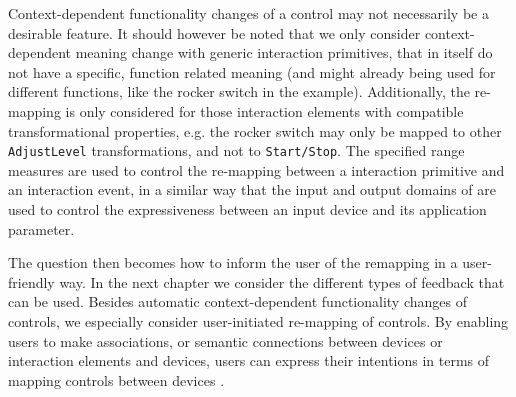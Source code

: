 Context-dependent functionality changes of a control may not necessarily be a desirable feature. It should however be noted that we only consider context-dependent meaning change with generic interaction primitives, that in itself do not have a specific, function related meaning (and might already being used for different functions, like the rocker switch in the example). Additionally, the re-mapping is only considered for those interaction elements with compatible transformational properties, e.g. the rocker switch may only be mapped to other \texttt{AdjustLevel} transformations, and not to \texttt{Start/Stop}. The specified range measures are used to control the re-mapping between a interaction primitive and an interaction event, in a similar way that the input and output domains of \cite{MacKinlay1990} are used to control the expressiveness between an input device and its application parameter. 

The question then becomes how to inform the user of the remapping in a user-friendly way. In the next chapter we consider the different types of feedback that can be used. Besides automatic context-dependent functionality changes of controls, we especially consider user-initiated re-mapping of controls. By enabling users to make associations, or semantic connections \cite{VanderVlist2010} between devices or interaction elements and devices, users can express their intentions in terms of mapping controls between devices \cite{Niezen2010}. 

% 



